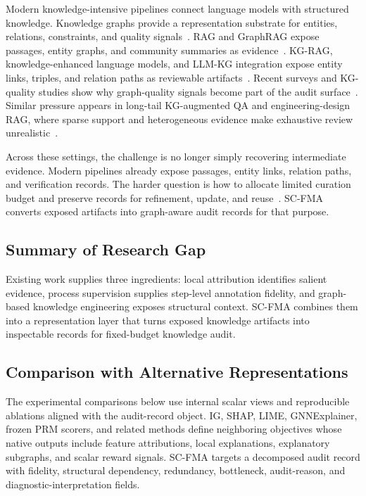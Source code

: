 \documentclass[a4paper,fleqn]{cas-sc}
\begin{document}
Modern knowledge-intensive pipelines connect language models with structured knowledge. Knowledge graphs provide a representation substrate for entities, relations, constraints, and quality signals~\cite{hogan2021knowledge}. RAG and GraphRAG expose passages, entity graphs, and community summaries as evidence~\cite{lewis2020rag,gao2023ragsurvey,edge2024graphrag}. KG-RAG, knowledge-enhanced language models, and LLM-KG integration expose entity links, triples, and relation paths as reviewable artifacts~\cite{sanmartin2024kgrag,hu2024knowledgeenhanced,pan2024unifying}. Recent surveys and KG-quality studies show why graph-quality signals become part of the audit surface~\cite{yang2025kbllmsurvey,chen2025kgquality,dai2025llmkg}. Similar pressure appears in long-tail KG-augmented QA and engineering-design RAG, where sparse support and heterogeneous evidence make exhaustive review unrealistic~\cite{huang2025prompting,siddharth2024retrieval,liu2025knowledgereasoning}.

Across these settings, the challenge is no longer simply recovering intermediate evidence. Modern pipelines already expose passages, entity links, relation paths, and verification records. The harder question is how to allocate limited curation budget and preserve records for refinement, update, and reuse~\cite{paulheim2017knowledge,higgins2008dcc}. SC-FMA converts exposed artifacts into graph-aware audit records for that purpose.

\subsection{Summary of Research Gap}

Existing work supplies three ingredients: local attribution identifies salient evidence, process supervision supplies step-level annotation fidelity, and graph-based knowledge engineering exposes structural context. SC-FMA combines them into a representation layer that turns exposed knowledge artifacts into inspectable records for fixed-budget knowledge audit.

\subsection{Comparison with Alternative Representations}

The experimental comparisons below use internal scalar views and reproducible ablations aligned with the audit-record object. IG, SHAP, LIME, GNNExplainer, frozen PRM scorers, and related methods define neighboring objectives whose native outputs include feature attributions, local explanations, explanatory subgraphs, and scalar reward signals. SC-FMA targets a decomposed audit record with fidelity, structural dependency, redundancy, bottleneck, audit-reason, and diagnostic-interpretation fields.
\end{document}
